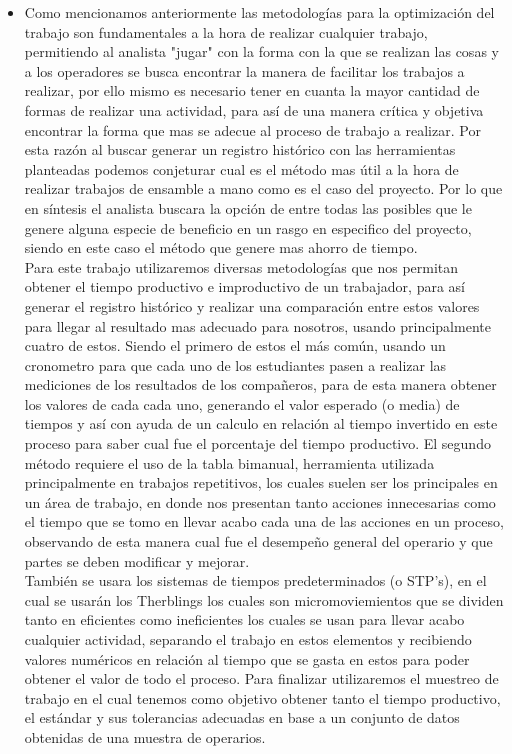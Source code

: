     
    \begin{itemize}
        \item Como mencionamos anteriormente las metodologías para la optimización del trabajo son fundamentales a la hora de realizar cualquier trabajo, permitiendo al analista "jugar" con la forma con la que se realizan las cosas y a los operadores se busca encontrar la manera de facilitar los trabajos a realizar, por ello mismo es necesario tener en cuanta la mayor cantidad de formas de realizar una actividad, para así de una manera crítica y objetiva encontrar la forma que mas se adecue al proceso de trabajo a realizar. Por esta razón al buscar generar un registro histórico con las herramientas planteadas podemos conjeturar cual es el método mas útil a la hora de realizar trabajos de ensamble a mano como es el caso del proyecto. Por lo que en síntesis el analista buscara la opción de entre todas las posibles que le genere alguna especie de beneficio en un rasgo en especifico del proyecto, siendo en este caso el método que genere mas ahorro de tiempo.
        \\Para este trabajo utilizaremos diversas metodologías que nos permitan obtener el tiempo productivo e improductivo de un trabajador, para así generar el registro histórico y realizar una comparación entre estos valores para llegar al resultado mas adecuado para nosotros, usando principalmente cuatro de estos. Siendo el primero de estos el más común, usando un cronometro para que cada uno de los estudiantes pasen a realizar las mediciones de los resultados de los compañeros, para de esta manera obtener los valores de cada cada uno, generando el valor esperado (o media) de tiempos y así con ayuda de un calculo en relación al tiempo invertido en este proceso para saber cual fue el porcentaje del tiempo productivo. El segundo método requiere el uso de la tabla bimanual, herramienta utilizada principalmente en trabajos repetitivos, los cuales suelen ser los principales en un área de trabajo, en donde nos presentan tanto acciones innecesarias como el tiempo que se tomo en llevar acabo cada una de las acciones en un proceso, observando de esta manera cual fue el desempeño general del operario y que partes se deben modificar y mejorar.
        \\También se usara los sistemas de tiempos predeterminados (o STP's), en el cual se usarán los Therblings los cuales son micromoviemientos que se dividen tanto en eficientes como ineficientes los cuales se usan para llevar acabo cualquier actividad, separando el trabajo en estos elementos y recibiendo valores numéricos en relación al tiempo que se gasta en estos para poder obtener el valor de todo el proceso. Para finalizar utilizaremos el muestreo de trabajo en el cual tenemos como objetivo obtener tanto el tiempo productivo, el estándar y sus tolerancias adecuadas en base a un conjunto de datos obtenidas de una muestra de operarios.
        \cite{EstTrabajo}
     
    \end{itemize}
